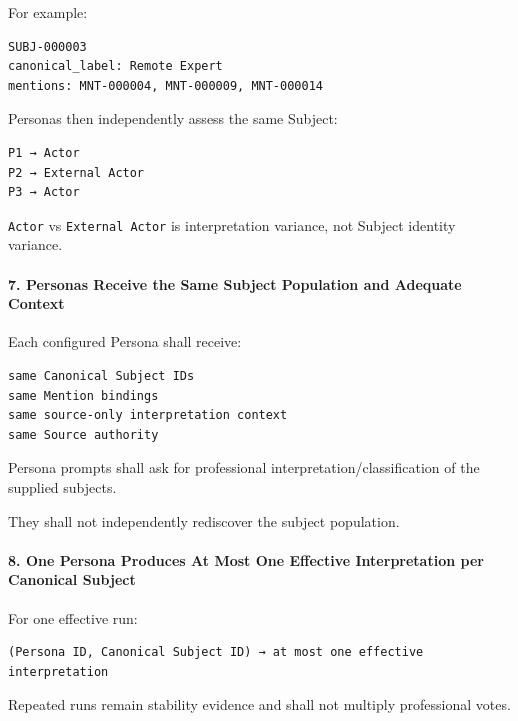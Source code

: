For example:

\begin{verbatim}
SUBJ-000003
canonical_label: Remote Expert
mentions: MNT-000004, MNT-000009, MNT-000014
\end{verbatim}

Personas then independently assess the same Subject:

\begin{verbatim}
P1 → Actor
P2 → External Actor
P3 → Actor
\end{verbatim}

\texttt{Actor} vs \texttt{External\ Actor} is interpretation variance, not Subject identity variance.

\hypertarget{7-personas-receive-the-same-subject-population-and-adequate-context}{%
\paragraph{7. Personas Receive the Same Subject Population and Adequate Context}\label{7-personas-receive-the-same-subject-population-and-adequate-context}}

Each configured Persona shall receive:

\begin{verbatim}
same Canonical Subject IDs
same Mention bindings
same source-only interpretation context
same Source authority
\end{verbatim}

Persona prompts shall ask for professional interpretation/classification of the supplied subjects.

They shall not independently rediscover the subject population.

\hypertarget{8-one-persona-produces-at-most-one-effective-interpretation-per-canonical-subject}{%
\paragraph{8. One Persona Produces At Most One Effective Interpretation per Canonical Subject}\label{8-one-persona-produces-at-most-one-effective-interpretation-per-canonical-subject}}

For one effective run:

\begin{verbatim}
(Persona ID, Canonical Subject ID) → at most one effective interpretation
\end{verbatim}

Repeated runs remain stability evidence and shall not multiply professional votes.

